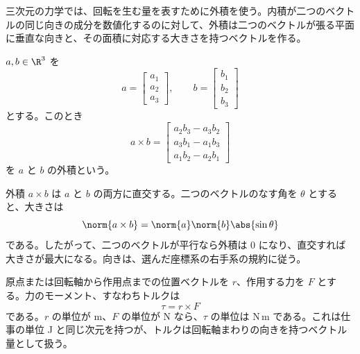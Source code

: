 三次元の力学では、回転を生む量を表すために外積を使う。内積が二つのベクトルの同じ向きの成分を数値化するのに対して、外積は二つのベクトルが張る平面に垂直な向きと、その面積に対応する大きさを持つベクトルを作る。

\begin{definition}[外積]
$a,b\in\R^3$ を
\begin{equation}
  a=\begin{bmatrix}a_1\\a_2\\a_3\end{bmatrix},
  \qquad
  b=\begin{bmatrix}b_1\\b_2\\b_3\end{bmatrix}
\end{equation}
とする。このとき
\begin{equation}
  a\times b
  =
  \begin{bmatrix}
    a_2b_3-a_3b_2\\
    a_3b_1-a_1b_3\\
    a_1b_2-a_2b_1
  \end{bmatrix}
\end{equation}
を $a$ と $b$ の外積という。
\end{definition}

外積 $a\times b$ は $a$ と $b$ の両方に直交する。二つのベクトルのなす角を $\theta$ とすると、大きさは
\begin{equation}
  \norm{a\times b}=\norm{a}\norm{b}\abs{\sin\theta}
\end{equation}
である。したがって、二つのベクトルが平行なら外積は 0 になり、直交すれば大きさが最大になる。向きは、選んだ座標系の右手系の規約に従う。

原点または回転軸から作用点までの位置ベクトルを $r$、作用する力を $F$ とする。力のモーメント、すなわちトルクは
\begin{equation}
  \tau=r\times F
\end{equation}
である。$r$ の単位が m、$F$ の単位が N なら、$\tau$ の単位は $\mathrm{N\,m}$ である。これは仕事の単位 J と同じ次元を持つが、トルクは回転軸まわりの向きを持つベクトル量として扱う。

